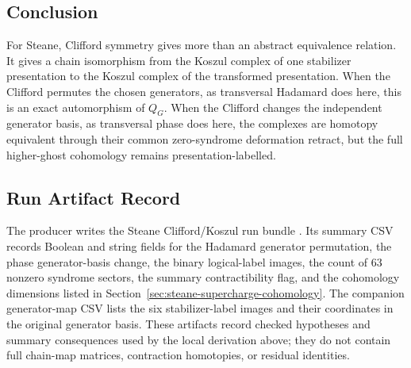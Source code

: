 \subsection{Conclusion}

For Steane, Clifford symmetry gives more than an abstract equivalence relation.
It gives a chain isomorphism from the Koszul complex of one stabilizer
presentation to the Koszul complex of the transformed presentation. When the
Clifford permutes the chosen generators, as transversal Hadamard does here,
this is an exact automorphism of \(Q_G\). When the Clifford changes the
independent generator basis, as transversal phase does here, the complexes are
homotopy equivalent through their common zero-syndrome deformation retract, but
the full higher-ghost cohomology remains presentation-labelled.

\subsection{Run Artifact Record}

The producer
 writes the
Steane Clifford/Koszul run bundle
. Its summary CSV
records Boolean and string fields for the Hadamard generator permutation, the
phase generator-basis change, the binary logical-label images, the count of
\(63\) nonzero syndrome sectors, the summary contractibility flag, and the
cohomology dimensions listed in
Section~\ref{sec:steane-supercharge-cohomology}. The companion generator-map
CSV lists the six stabilizer-label images and their coordinates in the original
generator basis. These artifacts record checked hypotheses and summary
consequences used by the local derivation above; they do not contain full
chain-map matrices, contraction homotopies, or residual identities.
